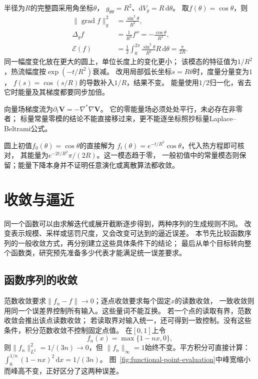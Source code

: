 \begin{example}
\label{ex:geometry-circle-energy-scale}
半径为$R$的完整圆采用角坐标$\theta$，
$g_{\theta\theta}=R^2$、$\mathrm dV_g=R\,\mathrm d\theta$。
取$f(\theta)=\cos\theta$，则
\[
 \begin{aligned}
 \lVert\operatorname{grad}f\rVert_g^2&=\frac{\sin^2\theta}{R^2},\\
 \Delta_gf&=\frac1{R^2}f''=-\frac{\cos\theta}{R^2},\\
 \mathcal E(f)&=\frac12\int_0^{2\pi}
        \frac{\sin^2\theta}{R^2}R\,\mathrm d\theta=\frac{\pi}{2R}.
 \end{aligned}
\]
同一幅度变化放在更大的圆上，单位长度上的变化更小；
该模态的特征值为$1/R^2$，热流幅度按$\exp(-t/R^2)$衰减。
改用局部弧长坐标$s=R\theta$时，度量分量变为$1$，
$f(s)=\cos(s/R)$的导数补入$1/R$，结果不变。
能量使用$1/2$归一化，省去它时能量及其梯度都要同步加倍。
\end{example}


向量场梯度流为$\partial_t\bm V=-\nabla^*\nabla\bm V$。
它的零能量场必须处处平行，未必存在非零者；
标量常量零模的结论不能直接移过来，更不能逐坐标照抄标量Laplace--Beltrami公式。


圆上初值$f_0(\theta)=\cos\theta$的直接解为
$f_t(\theta)=e^{-t/R^2}\cos\theta$，代入热方程即可核对，
其能量为$e^{-2t/R^2}\pi/(2R)$。这一模态趋于零，
一般初值中的常量模态则保留；能量下降本身并不证明任意演化或离散算法都收敛。

\section{收敛与逼近}
\label{sec:functional-convergence-approximation}

同一个函数可以由求解迭代或展开截断逐步得到，两种序列的生成规则不同。
改变表示规模、采样或惩罚尺度，又会改变可达到的逼近误差。
本节先比较函数序列的一般收敛方式，再分别建立这些具体条件下的结论；
最后从单个目标转向整个函数类，研究预先准备多少代表才能满足统一误差要求。

\subsection{函数序列的收敛}
\label{sec:functional-sequence-convergence}

范数收敛要求$\lVert f_n-f\rVert\to0$；逐点收敛要求每个固定$x$的读数收敛，
一致收敛则用同一个误差界控制所有输入。这些量词不能互换。
若一个点的读取有界，范数收敛会推出该点读数收敛；
若读取界对输入统一，还可得到一致控制。没有这些条件，积分范数收敛不控制固定点值。
在$[0,1]$上令
\[
  f_n(x)=\max\{1-nx,0\},
\]
则$\lVert f_n\rVert_{L^2}^2=1/(3n)\to0$，但
$\lVert f_n\rVert_{\infty}=1$始终不变。平方积分可直接计算：
$\int_0^{1/n}(1-nx)^2\,\mathrm dx=1/(3n)$。
图~\ref{fig:functional-point-evaluation}中峰宽缩小而峰高不变，正好区分了这两种误差。


